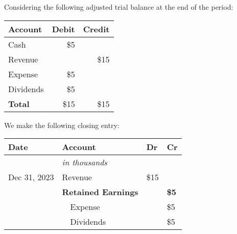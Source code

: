 \begin{tcolorbox}[colframe=black,colback=white,title=Example Closing Entry]
    Considering the following adjusted trial balance at the end of the period:

    \vspace{1em}

    \begin{tabular}{lrr}
        \textbf{Account} & \textbf{Debit} & \textbf{Credit} \\
        \hline
        Cash             & \$5            &                 \\
        Revenue          &                & \$15            \\
        Expense          & \$5            &                 \\
        Dividends        & \$5            &                 \\
        \hline
        \textbf{Total}   & \$15           & \$15            \\
    \end{tabular}

    \vspace{1em}

    We make the following closing entry:

    \vspace{1em}

    \begin{tabular}{llll}
        \textbf{Date} & \textbf{Account}           & \textbf{Dr} & \textbf{Cr}  \\
        \hline
                      & \textit{in thousands}      &             &              \\
        Dec 31, 2023  & Revenue                    & \$15        &              \\
                      & \textbf{Retained Earnings} &             & \textbf{\$5} \\
                      & $\quad$Expense             &             & \$5          \\
                      & $\quad$Dividends           &             & \$5          \\
    \end{tabular}
\end{tcolorbox}